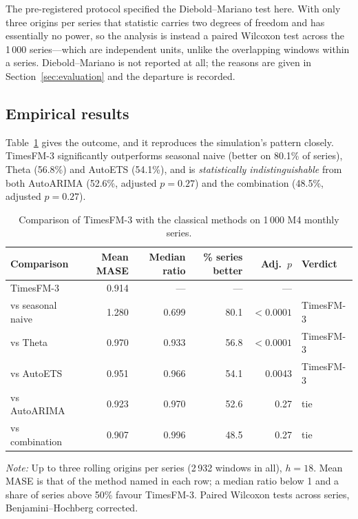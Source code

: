 \documentclass[11pt]{article}
\providecommand{\sectionref}[1]{Section~\ref{#1}}
\providecommand{\tableref}[1]{Table~\ref{#1}}
\begin{document}
The pre-registered protocol specified the Diebold--Mariano test here. With only three origins per
series that statistic carries two degrees of freedom and has essentially no power, so the analysis
is instead a paired Wilcoxon test across the 1\,000 series---which are independent units, unlike
the overlapping windows within a series. Diebold--Mariano is not reported at all; the reasons are
given in \sectionref{sec:evaluation} and the departure is recorded.

\subsection{Empirical results}
\label{sec:m4results}

\tableref{tab:realdata} gives the outcome, and it reproduces the simulation's pattern closely.
TimesFM-3 significantly outperforms seasonal naive (better on 80.1\% of series), Theta (56.8\%)
and AutoETS (54.1\%), and is \emph{statistically indistinguishable} from both AutoARIMA (52.6\%,
adjusted $p = 0.27$) and the combination (48.5\%, adjusted $p = 0.27$).

\begin{table}[!htbp]
\centering
\begin{threeparttable}
\caption{Comparison of TimesFM-3 with the classical methods on 1\,000 M4 monthly series.}
\label{tab:realdata}
\begin{tabular}{lrrrrl}
\toprule
Comparison & Mean MASE & Median ratio & \% series better & Adj.\ $p$ & Verdict \\
\midrule
TimesFM-3          & 0.914 & ---   & ---  & ---    & \\
\midrule
vs seasonal naive  & 1.280 & 0.699 & 80.1 & $<0.0001$ & TimesFM-3 \\
vs Theta           & 0.970 & 0.933 & 56.8 & $<0.0001$ & TimesFM-3 \\
vs AutoETS         & 0.951 & 0.966 & 54.1 & 0.0043    & TimesFM-3 \\
vs AutoARIMA       & 0.923 & 0.970 & 52.6 & 0.27      & tie \\
vs combination     & 0.907 & 0.996 & 48.5 & 0.27      & tie \\
\bottomrule
\end{tabular}
\begin{tablenotes}[flushleft]\footnotesize
\item \textit{Note:} Up to three rolling origins per series (2\,932 windows in all), $h = 18$.
Mean MASE is that of the method named in each row; a median ratio below 1 and a share of series
above 50\% favour TimesFM-3. Paired Wilcoxon tests across series, Benjamini--Hochberg corrected.
\end{tablenotes}
\end{threeparttable}
\end{table}
\end{document}
